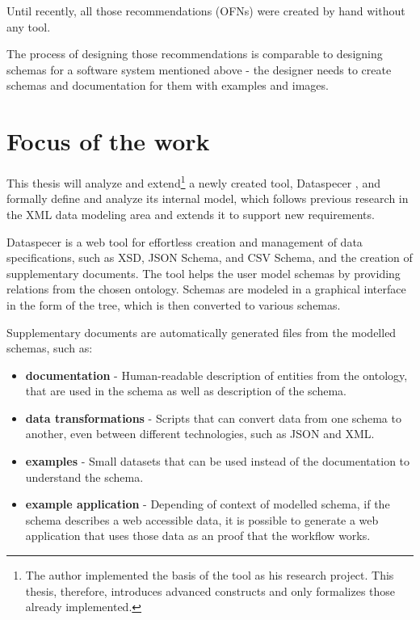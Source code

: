 Until recently, all those recommendations (OFNs) were created by hand without any tool.

\smallskip

The process of designing those recommendations is comparable to designing schemas for a software system mentioned above - the designer needs to create schemas and documentation for them with examples and images.

\section*{Focus of the work}

This thesis will analyze and extend\footnote{The author implemented the basis of the tool as his research project. This thesis, therefore, introduces advanced constructs and only formalizes those already implemented.} a newly created tool, Dataspecer \cite{dataspecer}, and formally define and analyze its internal model, which follows previous research in the XML data modeling area and extends it to support new requirements.

Dataspecer is a web tool for effortless creation and management of data specifications, such as XSD, JSON Schema, and CSV Schema, and the creation of supplementary documents. The tool helps the user model schemas by providing relations from the chosen ontology. Schemas are modeled in a graphical interface in the form of the tree, which is then converted to various schemas.

Supplementary documents are automatically generated files from the modelled schemas, such as:

\begin{itemize}
    \item \textbf{documentation} - Human-readable description of entities from the ontology, that are used in the schema as well as description of the schema.
    \item \textbf{data transformations} - Scripts that can convert data from one schema to another, even between different technologies, such as JSON and XML.
    \item \textbf{examples} - Small datasets that can be used instead of the documentation to understand the schema.
    \item \textbf{example application} - Depending of context of modelled schema, if the schema describes a web accessible data, it is possible to generate a web application that uses those data as an proof that the workflow works.
\end{itemize}

